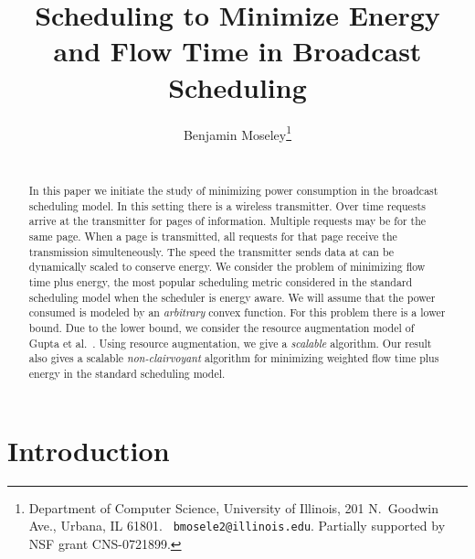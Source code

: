 \documentclass[11pt]{article}
\newcommand{\etal}{et al.\ }
\begin{document}
\title{Scheduling to Minimize Energy and Flow Time in Broadcast Scheduling }


\author{
Benjamin Moseley\thanks{Department of Computer Science, University of
Illinois, 201 N.\ Goodwin Ave., Urbana, IL 61801. {\tt
bmosele2@illinois.edu}. Partially supported by NSF grant
CNS-0721899.}\\\\\vspace{4mm} 
}


\date{}
\maketitle \vspace{-7mm}

\begin{abstract}








In this paper we initiate the study of minimizing power consumption in the broadcast scheduling model.  In this setting there is a wireless transmitter.  Over time requests arrive at the transmitter for pages of information.  Multiple requests may be for the same page.  When a page is transmitted, all requests for that page receive the transmission simulteneously.  The speed the transmitter sends data at can be dynamically scaled to conserve energy.  We consider the problem of minimizing flow time plus energy, the most popular scheduling metric considered in the standard scheduling model when the scheduler is energy aware.   We will assume that the power consumed is modeled by an \emph{arbitrary} convex function. For this problem there is a  lower bound.  Due to the lower bound, we consider the resource augmentation model of Gupta \etal \cite{GuptaKP10}.  Using resource augmentation, we give a \emph{scalable} algorithm.  Our result also gives a scalable \emph{non-clairvoyant} algorithm for minimizing weighted flow time plus energy in the standard scheduling model.









\end{abstract}

\setcounter{page}{0} \thispagestyle{empty} \clearpage



\section{Introduction}
\end{document}
